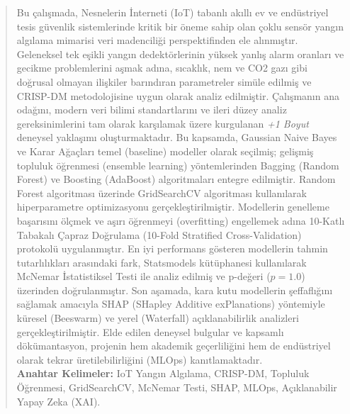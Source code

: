 \documentclass[12pt,a4paper]{article}
\begin{document}
\newpage

\renewcommand{\abstractname}{Özet}
\begin{abstract}
Bu çalışmada, Nesnelerin İnterneti (IoT) tabanlı akıllı ev ve endüstriyel tesis güvenlik sistemlerinde kritik bir öneme sahip olan çoklu sensör yangın algılama mimarisi veri madenciliği perspektifinden ele alınmıştır. Geleneksel tek eşikli yangın dedektörlerinin yüksek yanlış alarm oranları ve gecikme problemlerini aşmak adına, sıcaklık, nem ve CO2 gazı gibi doğrusal olmayan ilişkiler barındıran parametreler simüle edilmiş ve CRISP-DM metodolojisine uygun olarak analiz edilmiştir. Çalışmanın ana odağını, modern veri bilimi standartlarını ve ileri düzey analiz gereksinimlerini tam olarak karşılamak üzere kurgulanan \textit{+1 Boyut} deneysel yaklaşımı oluşturmaktadır. Bu kapsamda, Gaussian Naive Bayes ve Karar Ağaçları temel (baseline) modeller olarak seçilmiş; gelişmiş topluluk öğrenmesi (ensemble learning) yöntemlerinden Bagging (Random Forest) ve Boosting (AdaBoost) algoritmaları entegre edilmiştir. Random Forest algoritması üzerinde GridSearchCV algoritması kullanılarak hiperparametre optimizasyonu gerçekleştirilmiştir. Modellerin genelleme başarısını ölçmek ve aşırı öğrenmeyi (overfitting) engellemek adına 10-Katlı Tabakalı Çapraz Doğrulama (10-Fold Stratified Cross-Validation) protokolü uygulanmıştır. En iyi performans gösteren modellerin tahmin tutarlılıkları arasındaki fark, Statsmodels kütüphanesi kullanılarak McNemar İstatistiksel Testi ile analiz edilmiş ve p-değeri ($p = 1.0$) üzerinden doğrulanmıştır. Son aşamada, kara kutu modellerin şeffaflığını sağlamak amacıyla SHAP (SHapley Additive exPlanations) yöntemiyle küresel (Beeswarm) ve yerel (Waterfall) açıklanabilirlik analizleri gerçekleştirilmiştir. Elde edilen deneysel bulgular ve kapsamlı dökümantasyon, projenin hem akademik geçerliliğini hem de endüstriyel olarak tekrar üretilebilirliğini (MLOps) kanıtlamaktadır.\\

\vspace{0.5cm}
\noindent \textbf{Anahtar Kelimeler:} IoT Yangın Algılama, CRISP-DM, Topluluk Öğrenmesi, GridSearchCV, McNemar Testi, SHAP, MLOps, Açıklanabilir Yapay Zeka (XAI).
\end{abstract}

\newpage

\tableofcontents
\newpage
\end{document}

